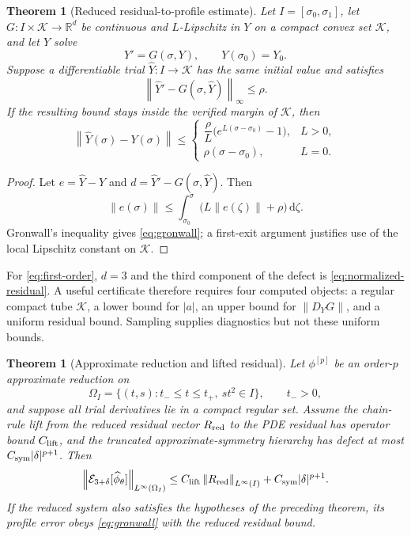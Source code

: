 \documentclass[11pt]{article}
\newcommand{\E}{\mathcal E}
\newcommand{\dd}{\,\mathrm d}
\newcommand{\norm}[1]{\left\lVert#1\right\rVert}
\newtheorem{theorem}[definition]{Theorem}
\begin{document}
\begin{theorem}[Reduced residual-to-profile estimate]
Let $I=[\sigma_0,\sigma_1]$, let $G:I\times\mathcal K\to\mathbb R^d$ be continuous and $L$-Lipschitz in $Y$ on a compact convex set $\mathcal K$, and let $Y$ solve
\begin{equation}
 Y'=G(\sigma,Y),\qquad Y(\sigma_0)=Y_0.
\end{equation}
Suppose a differentiable trial $\widehat Y:I\to\mathcal K$ has the same initial value and satisfies
\begin{equation}
 \norm{\widehat Y'-G(\sigma,\widehat Y)}_\infty\le\rho.
\end{equation}
If the resulting bound stays inside the verified margin of $\mathcal K$, then
\begin{equation}
 \norm{\widehat Y(\sigma)-Y(\sigma)}
 \le
 \begin{cases}
 \dfrac{\rho}{L}\bigl(e^{L(\sigma-\sigma_0)}-1\bigr),&L>0,\\[2mm]
 \rho(\sigma-\sigma_0),&L=0.
 \end{cases}
 \label{eq:gronwall}
\end{equation}
\end{theorem}

\begin{proof}
Let $e=\widehat Y-Y$ and $d=\widehat Y'-G(\sigma,\widehat Y)$.  Then
\[
 \norm{e(\sigma)}
 \le\int_{\sigma_0}^{\sigma}
 \bigl(L\norm{e(\zeta)}+\rho\bigr)\dd\zeta.
\]
Gronwall's inequality gives \cref{eq:gronwall}; a first-exit argument justifies use of the local Lipschitz constant on $\mathcal K$.
\end{proof}

For \cref{eq:first-order}, $d=3$ and the third component of the defect is \cref{eq:normalized-residual}.  A useful certificate therefore requires four computed objects: a regular compact tube $\mathcal K$, a lower bound for $|a|$, an upper bound for $\|D_YG\|$, and a uniform residual bound.  Sampling supplies diagnostics but not these uniform bounds.

\begin{theorem}[Approximate reduction and lifted residual]
Let $\phi^{[p]}$ be an order-$p$ approximate reduction on
\begin{equation}
 \Omega_I=\{(t,s):t_-\le t\le t_+,\ st^2\in I\},\qquad t_->0,
\end{equation}
and suppose all trial derivatives lie in a compact regular set.  Assume the chain-rule lift from the reduced residual vector $R_{\rm red}$ to the PDE residual has operator bound $C_{\rm lift}$, and the truncated approximate-symmetry hierarchy has defect at most $C_{\rm sym}|\delta|^{p+1}$.  Then
\begin{equation}
 \norm{\E_{3+\delta}[\widehat\phi_\theta]}_{L^\infty(\Omega_I)}
 \le C_{\rm lift}\norm{R_{\rm red}}_{L^\infty(I)}
      +C_{\rm sym}|\delta|^{p+1}.
 \label{eq:lift-bound}
\end{equation}
If the reduced system also satisfies the hypotheses of the preceding theorem, its profile error obeys \cref{eq:gronwall} with the reduced residual bound.
\end{theorem}
\end{document}
